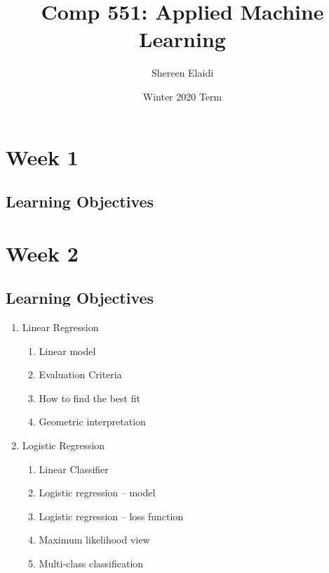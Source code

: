 \documentclass[11pt]{scrartcl}
\title{\textbf{Comp 551: Applied Machine Learning}}
\author{Shereen Elaidi}
\date{Winter 2020 Term}
\theoremstyle{definition}
\theoremstyle{remark}
\begin{document}
\maketitle
\tableofcontents

\section{Week 1}
\subsection{Learning Objectives}
\section{Week 2}
\subsection{Learning Objectives}
\begin{enumerate}[noitemsep]
	\item Linear Regression
	\begin{enumerate}[noitemsep]
		\item Linear model 
		\item Evaluation Criteria 
		\item How to find the best fit 
		\item Geometric interpretation 
	\end{enumerate}
	\item Logistic Regression
	\begin{enumerate}[noitemsep]
		\item Linear Classifier 
		\item Logistic regression -- model 
		\item Logistic regression -- loss function
		\item Maximum likelihood view 
		\item Multi-class classification
	\end{enumerate}
\end{enumerate}
\end{document}
